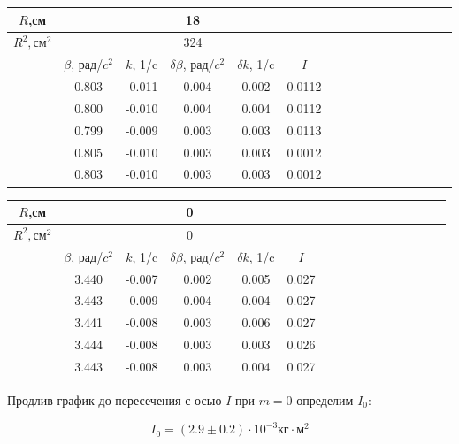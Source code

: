 \documentclass[14pt]{article}
\begin{document}
\begin{center}
\begin{tabular}{|c|c|c|c|c|c|c|c|c|c|c|c|c|c|c|c|}
\hline
$R$,см	&	\multicolumn{5}{|c|}{18}			\\
\hline
$R^2, \text{см}^2$	&	\multicolumn{5}{|c|}{324}			\\
\hline
		&	$\beta$, рад/$c^2$	&	$k$, 1/c	&	$\delta\beta$, рад/$c^2$	&	$\delta k$, 1/c		&	$I$		\\
\hline
		&	0.803				&	-0.011		&	0.004						&	0.002				&	0.0112	\\
\hline
		&	0.800				&	-0.010		&	0.004						&	0.004				&	0.0112	\\
\hline
		&	0.799				&	-0.009		&	0.003						&	0.003				&	0.0113	\\
\hline
		&	0.805				&	-0.010		&	0.003						&	0.003				&	0.0012	\\
\hline
		&	0.803				&	-0.010		&	0.003						&	0.003				&	0.0012	\\
\hline
\end{tabular}
\end{center}

\begin{center}
\begin{tabular}{|c|c|c|c|c|c|c|c|c|c|c|c|c|c|c|c|}
\hline
$R$,см	&	\multicolumn{5}{|c|}{0}			\\
\hline
$R^2, \text{см}^2$	&	\multicolumn{5}{|c|}{0}			\\
\hline
		&	$\beta$, рад/$c^2$	&	$k$, 1/c	&	$\delta\beta$, рад/$c^2$	&	$\delta k$, 1/c		&	$I$		\\
\hline
		&	3.440				&	-0.007		&	0.002						&	0.005				&	0.027	\\
\hline
		&	3.443				&	-0.009		&	0.004						&	0.004				&	0.027	\\
\hline
		&	3.441				&	-0.008		&	0.003						&	0.006				&	0.027	\\
\hline
		&	3.444				&	-0.008		&	0.003						&	0.003				&	0.026	\\
\hline
		&	3.443				&	-0.008		&	0.003						&	0.004				&	0.027	\\
\hline
\end{tabular}
\end{center}

\vspace{1cm}
\begin{flushleft}
\end{flushleft}

Продлив график до пересечения с осью $I$ при $m = 0$ определим $I_0$:

$$\boxed{I_0 = (2.9 \pm 0.2)\cdot 10^{-3}\text{кг}\cdot\text{м}^2}$$
\end{document}
